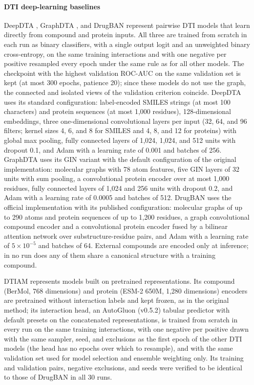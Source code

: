 \documentclass[11pt,letterpaper]{article}
\begin{document}
\paragraph{DTI deep-learning baselines}
DeepDTA \cite{ozturk2018deepdta}, GraphDTA \cite{nguyen2021graphdta}, and DrugBAN \cite{bai2023interpretable} represent pairwise DTI models that learn directly from compound and protein inputs. All three are trained from scratch in each run as binary classifiers, with a single output logit and an unweighted binary cross-entropy, on the same training interactions and with one negative per positive resampled every epoch under the same rule as for all other models. The checkpoint with the highest validation ROC-AUC on the same validation set is kept (at most 300 epochs, patience 20); since these models do not use the graph, the connected and isolated views of the validation criterion coincide. DeepDTA uses its standard configuration: label-encoded SMILES strings (at most 100 characters) and protein sequences (at most 1,000 residues), 128-dimensional embeddings, three one-dimensional convolutional layers per input (32, 64, and 96 filters; kernel sizes 4, 6, and 8 for SMILES and 4, 8, and 12 for proteins) with global max pooling, fully connected layers of 1,024, 1,024, and 512 units with dropout 0.1, and Adam with a learning rate of 0.001 and batches of 256. GraphDTA uses its GIN variant with the default configuration of the original implementation: molecular graphs with 78 atom features, five GIN layers of 32 units with sum pooling, a convolutional protein encoder over at most 1,000 residues, fully connected layers of 1,024 and 256 units with dropout 0.2, and Adam with a learning rate of 0.0005 and batches of 512. DrugBAN uses the official implementation with its published configuration: molecular graphs of up to 290 atoms and protein sequences of up to 1,200 residues, a graph convolutional compound encoder and a convolutional protein encoder fused by a bilinear attention network over substructure-residue pairs, and Adam with a learning rate of $5\times10^{-5}$ and batches of 64. External compounds are encoded only at inference; in no run does any of them share a canonical structure with a training compound.

DTIAM \cite{lu2025dtiam} represents models built on pretrained representations. Its compound (BerMol, 768 dimensions) and protein (ESM-2 650M, 1,280 dimensions) encoders are pretrained without interaction labels and kept frozen, as in the original method; its interaction head, an AutoGluon (v0.5.2) tabular predictor with default presets on the concatenated representations, is trained from scratch in every run on the same training interactions, with one negative per positive drawn with the same sampler, seed, and exclusions as the first epoch of the other DTI models (the head has no epochs over which to resample), and with the same validation set used for model selection and ensemble weighting only. Its training and validation pairs, negative exclusions, and seeds were verified to be identical to those of DrugBAN in all 30 runs.
\end{document}
